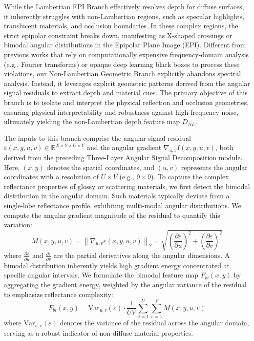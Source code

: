\documentclass[lettersize,journal]{IEEEtran}
\begin{document}
While the Lambertian EPI Branch effectively resolves depth for diffuse surfaces, it inherently struggles with non-Lambertian regions, such as specular highlights, translucent materials, and occlusion boundaries. In these complex regions, the strict epipolar constraint breaks down, manifesting as X-shaped crossings or bimodal angular distributions in the Epipolar Plane Image (EPI). Different from previous works that rely on computationally expensive frequency-domain analysis (e.g., Fourier transforms) or opaque deep learning black boxes to process these violations, our Non-Lambertian Geometric Branch explicitly abandons spectral analysis. Instead, it leverages explicit geometric patterns derived from the angular signal residuals to extract depth and material cues. The primary objective of this branch is to isolate and interpret the physical reflection and occlusion geometries, ensuring physical interpretability and robustness against high-frequency noise, ultimately yielding the non-Lambertian depth feature map $D_{NL}$.

The inputs to this branch comprise the angular signal residual $\varepsilon(x, y, u, v) \in \mathbb{R}^{X \times Y \times U \times V}$ and the angular gradient $\nabla_{u,v} I(x, y, u, v)$, both derived from the preceding Three-Layer Angular Signal Decomposition module. Here, $(x,y)$ denotes the spatial coordinates, and $(u,v)$ represents the angular coordinates with a resolution of $U \times V$ (e.g., $9 \times 9$). To capture the complex reflectance properties of glossy or scattering materials, we first detect the bimodal distribution in the angular domain. Such materials typically deviate from a single-lobe reflectance profile, exhibiting multi-modal angular distributions. We compute the angular gradient magnitude of the residual to quantify this variation:
\begin{equation}
M(x,y,u,v) = \left\| \nabla_{u,v} \varepsilon(x,y,u,v) \right\|_2 = \sqrt{ \left( \frac{\partial \varepsilon}{\partial u} \right)^2 + \left( \frac{\partial \varepsilon}{\partial v} \right)^2 }
\label{eq:ch3_12}
\end{equation}
where $\frac{\partial \varepsilon}{\partial u}$ and $\frac{\partial \varepsilon}{\partial v}$ are the partial derivatives along the angular dimensions. A bimodal distribution inherently yields high gradient energy concentrated at specific angular intervals. We formulate the bimodal feature map $F_{bi}(x,y)$ by aggregating the gradient energy, weighted by the angular variance of the residual to emphasize reflectance complexity:
\begin{equation}
F_{bi}(x,y) = \text{Var}_{u,v}(\varepsilon) \cdot \frac{1}{UV} \sum_{u=1}^{U} \sum_{v=1}^{V} M(x,y,u,v)
\label{eq:ch3_13}
\end{equation}
where $\text{Var}_{u,v}(\varepsilon)$ denotes the variance of the residual across the angular domain, serving as a robust indicator of non-diffuse material properties.
\end{document}

